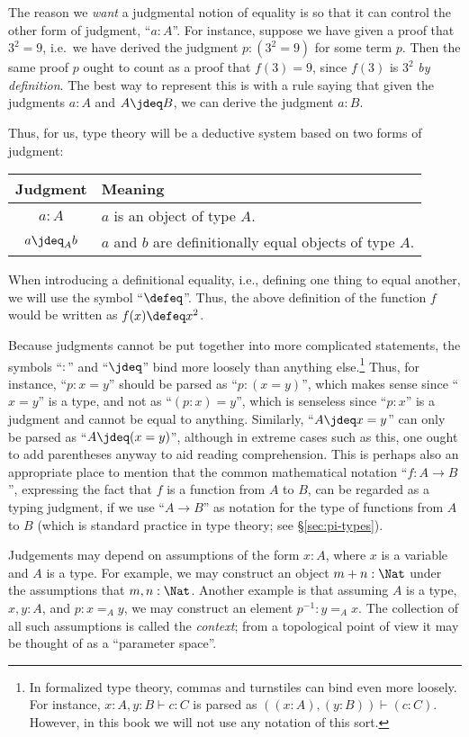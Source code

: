 {The reason we \emph{want} a judgmental notion of equality is so that it can control the other form of judgment, ``$a:A$''.
For instance, suppose we have given a proof that $3^2=9$, i.e.\ we have derived the judgment $p:(3^2=9)$ for some term $p$.
Then the same proof $p$ ought to count as a proof that $f(3)=9$, since $f(3)$ is $3^2$ \emph{by definition}.
The best way to represent this is with a rule saying that given the judgments $a:A$ and $A\jdeq B$, we can derive the judgment $a:B$.

Thus, for us, type theory will be a deductive system based on two forms of judgment:
\begin{center}
\begin{tabular}{c|l}
  \textbf{Judgment} & \textbf{Meaning}\\\hline
  $a : A$ & $a$ is an object of type $A$.\\
  $a \jdeq_A b$ & $a$ and $b$ are definitionally equal objects of type $A$.
\end{tabular}
\end{center}
When introducing a definitional equality, i.e., defining one thing to equal another, we will use the symbol ``$\defeq$''.
Thus, the above definition of the function $f$ would be written as $f(x)\defeq x^2$.

Because judgments cannot be put together into more complicated statements, the symbols ``$:$'' and ``$\jdeq$'' bind more loosely than anything else.\footnote{In formalized type theory, commas and turnstiles can bind even more loosely.
  For instance, $x:A,y:B\vdash c:C$ is parsed as $((x:A),(y:B))\vdash (c:C)$.
  However, in this book we will not use any notation of this sort.}
Thus, for instance, ``$p:x=y$'' should be parsed as ``$p:(x=y)$'', which makes sense since ``$x=y$'' is a type, and not as ``$(p:x)=y$'', which is senseless since ``$p:x$'' is a judgment and cannot be equal to anything.
Similarly, ``$A\jdeq x=y$'' can only be parsed as ``$A\jdeq(x=y)$'', although in extreme cases such as this, one ought to add parentheses anyway to aid reading comprehension.
This is perhaps also an appropriate place to mention that the common mathematical notation ``$f:A\to B$'', expressing the fact that $f$ is a function from $A$ to $B$, can be regarded as a typing judgment, if we use ``$A\to B$'' as notation for the type of functions from $A$ to $B$ (which is standard practice in type theory; see \S\ref{sec:pi-types}).

Judgements may depend on assumptions of the form $x:A$, where $x$ is a variable and $A$ is a type.
For example, we may construct an object $m + n : \Nat$ under the assumptions that $m,n : \Nat$.
Another example is that assuming $A$ is a type, $x,y : A$, and $p : x =_A y$, we may construct an element $p^{-1} : y =_A x$.
The collection of all such assumptions is called the \emph{context}; from a topological point of view it may be thought of as a ``parameter space''.

}
